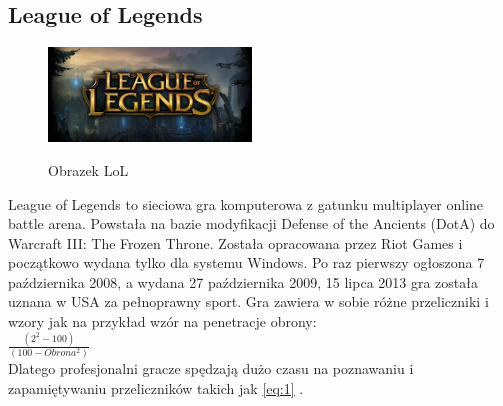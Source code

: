\documentclass{article}
\begin{document}
\subsection{League of Legends}
\begin{figure}
\begin{center}
\vspace{-20pt}
\label{rys2}
\includegraphics[width=0.48\textwidth]{lol}
\caption[Obrazek LoL]{Obrazek LoL}
\end{center}
\vspace{-20pt}
\vspace{-10pt}
\end{figure}
League of Legends to sieciowa gra komputerowa z gatunku multiplayer online battle arena. Powstała na bazie modyfikacji Defense of the Ancients (DotA) do Warcraft III: The Frozen Throne. Została opracowana przez Riot Games i początkowo wydana tylko dla systemu Windows. Po raz pierwszy ogłoszona 7 października 2008, a wydana 27 października 2009, 15 lipca 2013 gra została uznana w USA za pełnoprawny sport. Gra zawiera w sobie różne przeliczniki i wzory jak na przykład wzór na penetracje obrony:\\
\begin{math}
\frac{ (2^2-100) }{ (100-Obrona^2) }\quad
\label{eq:1}
\end{math}\\
Dlatego profesjonalni gracze spędzają dużo czasu na poznawaniu i zapamiętywaniu przeliczników takich jak \ref{eq:1} .
\end{document}
